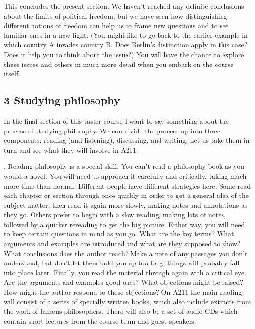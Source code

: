 \documentclass[letterpaper,10pt,english]{sphinxmanual}
\begin{document}
This concludes the present section. We haven’t reached any definite conclusions about the limits of political freedom, but we have seen how distinguishing different notions of freedom can help us to frame new questions and to see familiar ones in a new light. (You might like to go back to the earlier example in which country A invades country B. Does Berlin’s distinction apply in this case? Does it help you to think about the issue?) You will have the chance to explore these issues and others in
much more detail when you embark on the course itself.


\subsection{3 Studying philosophy}
\label{\detokenize{content/session_00/Part_00_03:3-Studying-philosophy}}\label{\detokenize{content/session_00/Part_00_03::doc}}
In the final section of this taster course I want to say something about the process of studying philosophy. We can divide the process up into three components: reading (and listening), discussing, and writing. Let us take them in turn and see what they will involve in A211.

. Reading philosophy is a special skill. You can’t read a philosophy book as you would a novel. You will need to approach it carefully and critically, taking much more time than normal. Different people have different strategies here. Some read each chapter or section through once quickly in order to get a general idea of the subject matter, then read it again more slowly, making notes and annotations as they go. Others prefer to begin with a slow reading, making lots of notes,
followed by a quicker re\sphinxhyphen{}reading to get the big picture. Either way, you will need to keep certain questions in mind as you go. What are the key terms? What arguments and examples are introduced and what are they supposed to show? What conclusions does the author reach? Make a note of any passages you don’t understand, but don’t let them hold you up too long; things will probably fall into place later. Finally, you read the material through again with a critical eye. Are the arguments and
examples good ones? What objections might be raised? How might the author respond to these objections? On A211 the main reading will consist of a series of specially written books, which also include extracts from the work of famous philosophers. There will also be a set of audio CDs which contain short lectures from the course team and guest speakers.
\end{document}
